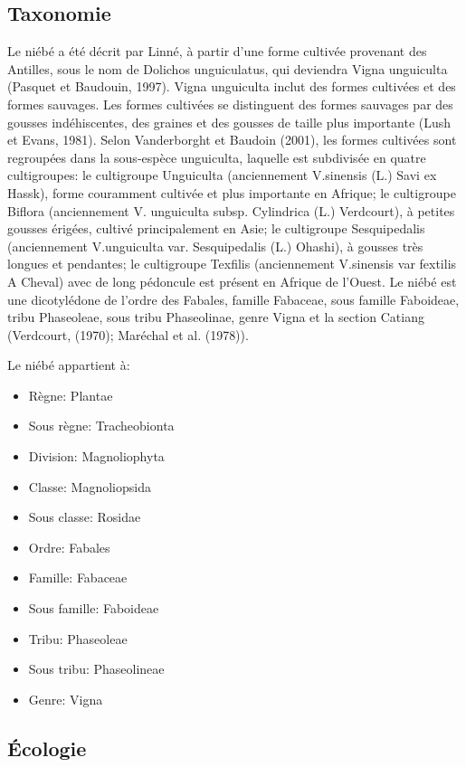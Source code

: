 \documentclass[a4paper,11pt]{article}
\begin{document}
\subsection{Taxonomie}

Le niébé a été décrit par Linné, à partir d’une forme cultivée
provenant des Antilles, sous le nom de Dolichos unguiculatus, qui
deviendra Vigna unguiculta (Pasquet et Baudouin, 1997). Vigna
unguiculta inclut des formes cultivées et des formes sauvages. Les
formes cultivées se distinguent des formes sauvages par des gousses
indéhiscentes, des graines et des gousses de taille plus importante
(Lush et Evans, 1981). Selon Vanderborght et Baudoin (2001), les
formes cultivées sont regroupées dans la sous-espèce unguiculta,
laquelle est subdivisée en quatre cultigroupes: le cultigroupe
Unguiculta (anciennement V.sinensis (L.) Savi ex Hassk), forme
couramment cultivée et plus importante en Afrique; le cultigroupe
Biflora (anciennement V. unguiculta subsp. Cylindrica (L.) Verdcourt),
à petites gousses érigées, cultivé principalement en Asie; le
cultigroupe Sesquipedalis (anciennement V.unguiculta
var. Sesquipedalis (L.) Ohashi), à gousses très longues et pendantes;
le cultigroupe Texfilis (anciennement V.sinensis var fextilis A Cheval)
avec de long pédoncule est présent en Afrique de l’Ouest. Le
niébé est une dicotylédone de l’ordre des Fabales, famille Fabaceae,
sous famille Faboideae, tribu Phaseoleae, sous tribu Phaseolinae,
genre Vigna et la section Catiang (Verdcourt, (1970); Maréchal et al. (1978))\cite{Sawadogo_2009}.

Le niébé appartient à:
\begin{itemize} 
\item Règne: Plantae
\item Sous règne: Tracheobionta
\item Division: Magnoliophyta
\item Classe: Magnoliopsida
\item Sous classe: Rosidae
\item Ordre: Fabales
\item Famille: Fabaceae
\item Sous famille: Faboideae
\item Tribu: Phaseoleae
\item Sous tribu: Phaseolineae
\item Genre: Vigna
\end{itemize}

\subsection{Écologie}
\end{document}
